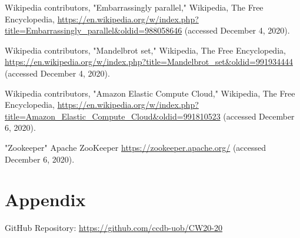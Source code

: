 \documentclass[runningheads,a4paper]{llncs}
\begin{document}
\begin{thebibliography}{4}

Wikipedia contributors, "Embarrassingly parallel," Wikipedia, The Free Encyclopedia, \url{https://en.wikipedia.org/w/index.php?title=Embarrassingly_parallel&oldid=988058646} (accessed December 4, 2020).

Wikipedia contributors, "Mandelbrot set," Wikipedia, The Free Encyclopedia, \url{https://en.wikipedia.org/w/index.php?title=Mandelbrot_set&oldid=991934444} (accessed December 4, 2020).

Wikipedia contributors, "Amazon Elastic Compute Cloud," Wikipedia, The Free Encyclopedia, \url{https://en.wikipedia.org/w/index.php?title=Amazon_Elastic_Compute_Cloud&oldid=991810523} (accessed December 6, 2020).

"Zookeeper" Apache ZooKeeper \url{https://zookeeper.apache.org/} (accessed December 6, 2020).


\end{thebibliography}

\section*{Appendix}

GitHub Repository: \url{https://github.com/ccdb-uob/CW20-20}
\end{document}
